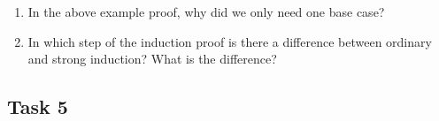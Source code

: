 \documentclass[12pt,letterpaper]{article}
\newif\ifsol
\newcommand{\solu}[2]{ \begin{mdframed} \ifsol #2 \else \vspace{#1} \fi \end{mdframed} }
\begin{document}
\begin{enumerate}
    \item In the above example proof, why did we only need one base case?
    
    \solu{1cm}{We had the guarantee that $a$ and $b$ are between 2 and $k$, so there was no risk of them being less than our highest base case.}
    
    \item In which step of the induction proof is there a difference between ordinary and strong induction? What is the difference? 
    
    \solu{1cm}{Inductive Hypothesis! (see description of strong induction above). In weak induction, we only assume that particular statement holds at k-th step, while in strong induction, we assume that the particular statement holds at all the steps from the base case to the k-th step.

    Note: A common incorrect answer here is 'multiple base cases for strong induction
'.}
\end{enumerate}

\subsection*{Task 5}
\end{document}
